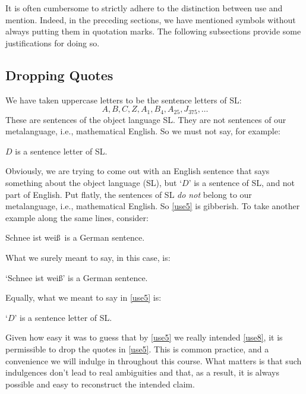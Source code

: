 It is often cumbersome to strictly adhere to the distinction between use and mention.
Indeed, in the preceding sections, we have mentioned symbols without always putting them in quotation marks.
The following subsections provide some justifications for doing so.





\subsection{Dropping Quotes}
  \label{sub:DropQuote}

We have taken uppercase letters to be the sentence letters of SL:
	$$A, B, C, Z, A_1, B_4, A_{25}, J_{375},\ldots$$
These are sentences of the object language SL.
They are not sentences of our metalanguage, i.e., mathematical English.
So we must not say, for example:

	\begin{earg}
    \item[\ex{use5}] $D$ is a sentence letter of SL.
	\end{earg}

Obviously, we are trying to come out with an English sentence that says something about the object language (SL), but `$D$' is a sentence of SL, and not part of English.
Put flatly, the sentences of SL \textit{do not} belong to our metalanguage, i.e., mathematical English.
So \ref{use5} is gibberish.
To take another example along the same lines, consider:

	\begin{earg}
    \item[\ex{use6}] Schnee ist wei\ss\ is a German sentence.
	\end{earg}

What we surely meant to say, in this case, is:

	\begin{earg}
    \item[\ex{use7}] `Schnee ist wei\ss' is a German sentence.
	\end{earg}

Equally, what we meant to say in \ref{use5} is:

	\begin{earg}
    \item[\ex{use8}] `$D$' is a sentence letter of SL.
	\end{earg}

Given how easy it was to guess that by \ref{use5} we really intended \ref{use8}, it is permissible to drop the quotes in \ref{use5}.
This is common practice, and a convenience we will indulge in throughout this course.
What matters is that such indulgences don't lead to real ambiguities and that, as a result, it is always possible and easy to reconstruct the intended claim.




